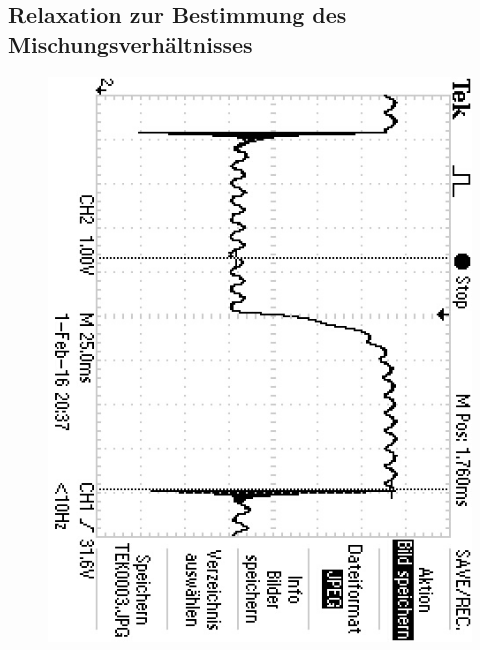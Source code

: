 \subsection{Relaxation zur Bestimmung des Mischungsverhältnisses}
\begin{figure}[h!]
	\centering
	\includegraphics[angle = 90, trim = 0.5cm 1.65cm 0.3cm 0cm, clip]{../Grafiken/Resonanz_1_Exp_Anstieg_05V.jpg}	

\end{figure}
